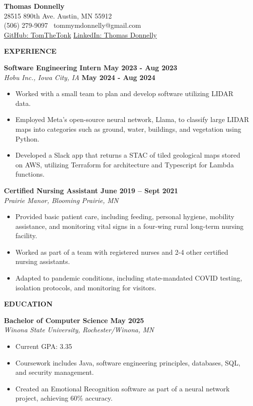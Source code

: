 \textbf{Thomas Donnelly}\\
28515 890th Ave. \textbar{} Austin, MN 55912\\
(506) 279-9097 \textbar~tommymdonnelly@gmail.com\\
\href{https://github.com/TomTheTonk}{GitHub: TomTheTonk}
\href{http://linkedin.com/in/thomas-donnelly-429405320}{LinkedIn: Thomas
Donnelly}

\textbf{EXPERIENCE}

\textbf{Software Engineering Intern May 2023 - Aug 2023}\\
\emph{Hobu Inc., Iowa City, IA} \textbf{May 2024 - Aug 2024}

\begin{itemize}
\item
  Worked with a small team to plan and develop software utilizing LIDAR
  data.
\item
  Employed Meta's open-source neural network, Llama, to classify large
  LIDAR maps into categories such as ground, water, buildings, and
  vegetation using Python.
\item
  Developed a Slack app that returns a STAC of tiled geological maps
  stored on AWS, utilizing Terraform for architecture and Typescript for
  Lambda functions.
\end{itemize}

\textbf{Certified Nursing Assistant June 2019 -- Sept 2021}\\
\emph{Prairie Manor, Blooming Prairie, MN}

\begin{itemize}
\item
  Provided basic patient care, including feeding, personal hygiene,
  mobility assistance, and monitoring vital signs in a four-wing rural
  long-term nursing facility.
\item
  Worked as part of a team with registered nurses and 2-4 other
  certified nursing assistants.
\item
  Adapted to pandemic conditions, including state-mandated COVID
  testing, isolation protocols, and monitoring for visitors.
\end{itemize}

\textbf{EDUCATION}

\textbf{Bachelor of Computer Science May 2025}\\
\emph{Winona State University, Rochester/Winona, MN}

\begin{itemize}
\item
  Current GPA: 3.35
\item
  Coursework includes Java, software engineering principles, databases,
  SQL, and security management.
\item
  Created an Emotional Recognition software as part of a neural network
  project, achieving 60\% accuracy.
\end{itemize}

